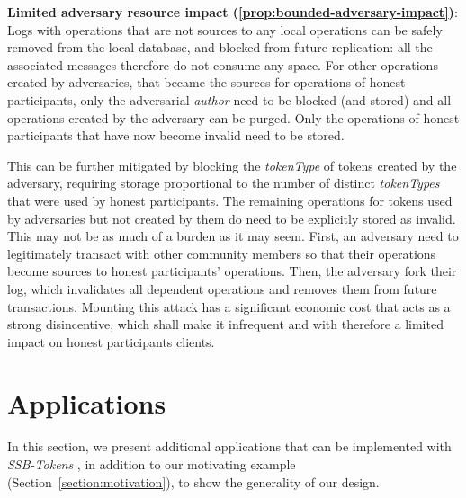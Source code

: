 \documentclass[sigplan,screen,10pt]{acmart}
\newcommand\ssbtokens[0]{\textit{SSB-Tokens} }
\begin{document}
\textbf{Limited adversary resource impact (\ref{prop:bounded-adversary-impact})}: Logs with operations that are not sources to any local operations can be safely removed from the local database, and blocked from future replication: all the associated messages therefore do not consume any space.
For other operations created by adversaries, that became the sources for operations of honest participants, only the adversarial \textit{author} need to be blocked (and stored) and all operations created by the adversary can be purged. Only the operations of honest participants that have now become invalid need to be stored.

This can be further mitigated by blocking the \textit{tokenType} of tokens created by the adversary, requiring storage proportional to the number of distinct \textit{tokenTypes} that were used by honest participants. The remaining operations for tokens used by adversaries but not created by them do need to be explicitly stored as invalid. This may not be as much of a burden as it may seem. First, an adversary need to legitimately transact with other community members so that their operations become sources to honest participants' operations. Then, the adversary fork their log, which invalidates all dependent operations and removes them from future transactions. Mounting this attack has a significant economic cost that acts as a strong disincentive, which shall make it infrequent and with therefore a limited impact on honest participants clients.







\section{Applications}
\label{section:applications}

In this section, we present additional applications that can be implemented with \ssbtokens, in addition to our motivating example (Section~\ref{section:motivation}), to show the generality of our design.
\end{document}
